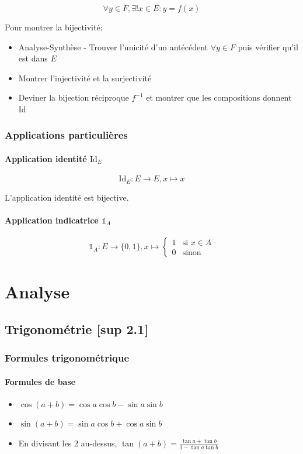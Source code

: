 \documentclass[openany]{book}
\begin{document}
\[ \forall y \in F, \exists ! x \in E : y=f(x) \]

\noindent Pour montrer la bijectivité:
\begin{itemize}
    \item Analyse-Synthèse - Trouver l'unicité d'un antécédent $\forall y \in F$ puis vérifier qu'il est dans $E$
    \item Montrer l'injectivité et la surjectivité
    \item Deviner la bijection réciproque $f^{-1}$ et montrer que les compositions donnent Id
\end{itemize}

\subsection{Applications particulières}
\subsubsection{Application identité $\text{Id}_E$}
\[
    \text{Id}_E : E \to E, x \mapsto x
\]

\noindent L'application identité est bijective. 

\subsubsection{Application indicatrice $\mathbb{1}_A$}
\[
    \mathbb{1}_A : E \to \{0, 1\}, x \mapsto \begin{cases}
        1 & \text{si } x\in A \\
        0 & \text{sinon}
    \end{cases}
\]

\clearpage

\chapter{Analyse}
\section{Trigonométrie [sup 2.1]}
\subsection{Formules trigonométrique}
\subsubsection{Formules de base}
\begin{itemize}
    \item $ \cos{(a+b)} = \cos{a}\cos{b}-\sin{a}\sin{b} $
    \item $ \sin{(a+b)} = \sin{a}\cos{b}+\cos{a}\sin{b} $
    \item En divisant les 2 au-dessus, $ \tan{(a+b)} = \frac{\tan{a}+\tan{b}}{1-\tan{a}\tan{b}} $
\end{itemize}
\end{document}
